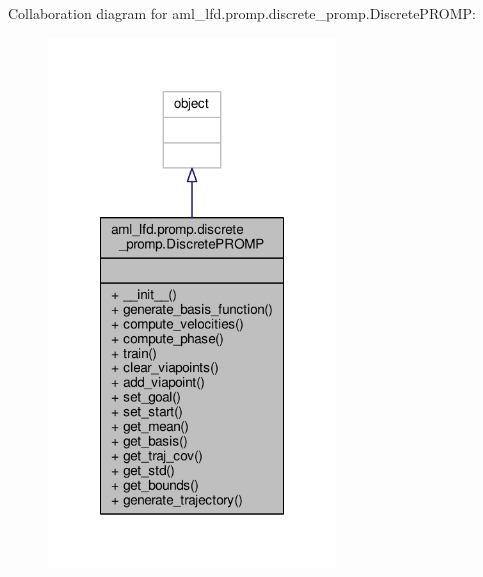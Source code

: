 Collaboration diagram for aml\-\_\-lfd.\-promp.\-discrete\-\_\-promp.\-Discrete\-P\-R\-O\-M\-P\-:\nopagebreak
\begin{figure}[H]
\begin{center}
\leavevmode
\includegraphics[width=216pt]{classaml__lfd_1_1promp_1_1discrete__promp_1_1_discrete_p_r_o_m_p__coll__graph}
\end{center}
\end{figure}
